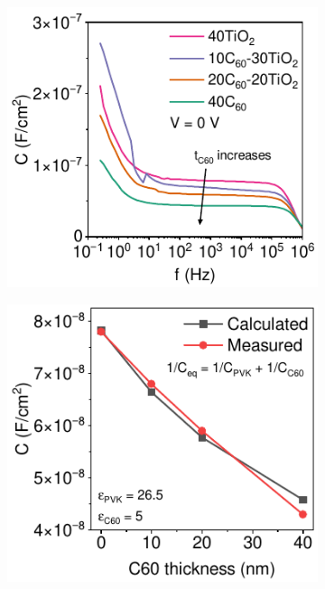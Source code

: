 \begin{figure}[ht!]
\begin{subfigure}[t]{0.37\textwidth}
        \caption{}
        \label{}
    \end{subfigure} 
    \begin{subfigure}[t]{0.44\textwidth}
        \centering
        \includegraphics[width=\textwidth]{chapters/transport_layers/images/Cf_comparison.pdf} %
        \caption{}
        \label{}
    \end{subfigure}
    \hspace{0.5cm}
    \begin{subfigure}[t]{0.4\textwidth}
        \centering
        \includegraphics[width=\textwidth]{chapters/transport_layers/images/C_f_c60_thick.pdf} %

\end{subfigure}
\end{figure}
